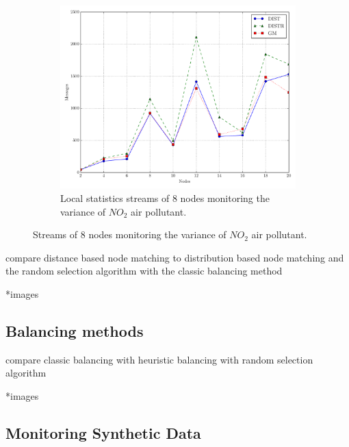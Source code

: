 \begin{figure}[t!]
\begin{subfigure}[t]{0.31\textwidth}
\end{subfigure}
\begin{subfigure}[t]{0.31\textwidth}
\centering
\includegraphics[scale=0.28]{img/matching_msg_noisyinterweaving.pdf}
\caption{Local statistics streams of 8 nodes monitoring the variance of $NO_2$ air pollutant.} 
\end{subfigure}
\vspace{0.5cm}
\caption{Streams of 8 nodes monitoring the variance of $NO_2$ air pollutant.}\label{fig:NO2_sq}
\end{figure}



compare distance based node matching to distribution based node matching and the random selection algorithm with the classic balancing method

*images

\subsection{Balancing methods} \label{subsec:balComp}

compare classic balancing with heuristic balancing with random selection algorithm

*images

\subsection{Monitoring Synthetic Data} \label{subsec:mainComp}

